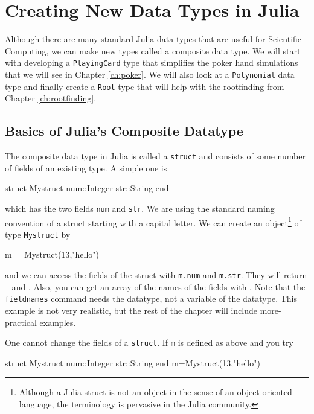 %

\chapter{Creating New Data Types in Julia}\label{ch:comp-types}

Although there are many standard Julia data types that are useful for Scientific Computing, we can make new types called a composite data type.  We will start with developing a \texttt{PlayingCard} type that simplifies the poker hand simulations that we will see in Chapter \ref{ch:poker}.  We will also look at a \texttt{Polynomial} data type and finally create a \texttt{Root} type that will help with the rootfinding from Chapter \ref{ch:rootfinding}.

\section{Basics of Julia's Composite Datatype} 

The composite data type in Julia is called a \texttt{struct} and consists of some number of fields of an existing type.  A simple one is 
\begin{jlblock}[newtype]
struct Mystruct
  num::Integer
  str::String
end
\end{jlblock}
%
which has the two fields \texttt{num} and \texttt{str}. We are using the standard naming convention of a struct starting with a capital letter.  We can create an object\footnote{Although a Julia struct is not an object in the sense of an object-oriented language, the terminology is pervasive in the Julia community.} of type \texttt{Mystruct} by
% 
\begin{jlblock}[newtype]
m = Mystruct(13,"hello")
\end{jlblock}
and we can access the fields of the struct with \texttt{m.num} and \texttt{m.str}.  They will return  \printpythontex[verb]~ and  \printpythontex[verb].   Also, you can get an array of the names of the fields with .  Note that the \texttt{fieldnames} command needs the datatype, not a variable of the datatype. This example is not very realistic, but the rest of the chapter will include more-practical examples. 

One cannot change the fields of a \texttt{struct}.  If \texttt{m} is defined as above and you try
\begin{jlcode}
struct Mystruct
  num::Integer
  str::String
end
m=Mystruct(13,"hello")
\end{jlcode}

